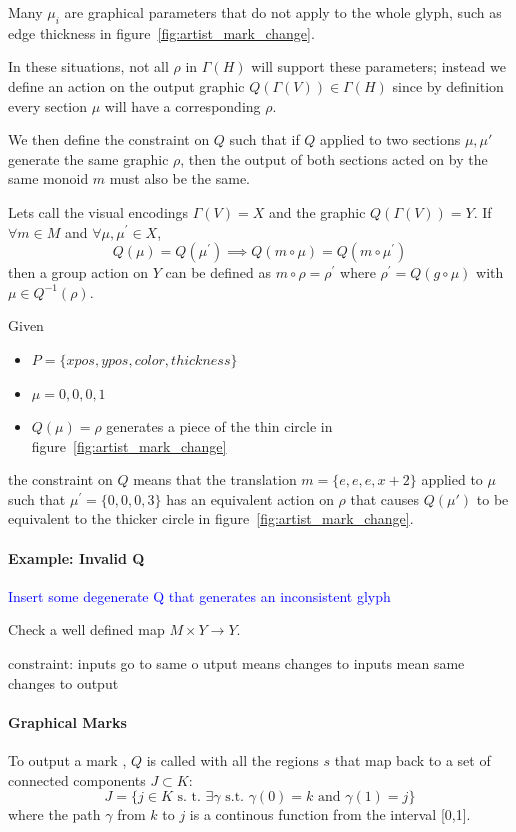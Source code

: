 \documentclass[../main.tex]{subfiles}
\begin{document}
Many $\mu_{i}$ are graphical parameters that do not apply to the whole glyph, such as edge thickness in figure~\ref{fig:artist_mark_change}. 

In these situations, not all  $\rho$ in $\Gamma(H)$ will support these parameters; instead we define an action on the output graphic $Q(\Gamma(V)) \in \Gamma(H)$ since by definition every section $\mu$ will have a corresponding $\rho$.

We then define the constraint on $Q$ such that if $Q$ applied to two sections $\mu, \mu\prime$ generate the same graphic $\rho$, then the output of both sections acted on by the same monoid $m$ must also be the same.    

Lets call the visual encodings $\Gamma(V)=X$ and the graphic $Q(\Gamma(V))=Y$. If $\forall m \in M$ and $\forall \mu, \mu^\prime \in X$, 
\begin{equation}
Q(\mu) = Q(\mu^\prime)\implies Q(m\circ\mu) = Q(m\circ\mu^\prime)
\end{equation}
then a group action on $Y$ can be defined as $m\circ \rho = \rho^\prime$ where $\rho^\prime=Q(g\circ \mu)$ with $\mu \in Q^{-1}(\rho)$. 

Given  
\begin{itemize}
    \item $P = \{xpos, ypos, color, thickness\}$
    \item $\mu = {0,0,0, 1}$
    \item  $Q(\mu)=\rho$ generates a piece of the thin circle in figure~\ref{fig:artist_mark_change}
\end{itemize}

the constraint on $Q$ means that the translation $m=\{e, e, e, x+2\}$ applied to $\mu$ such that $\mu^\prime=\{0,0,0,3\}$ has an equivalent action on $\rho$ that causes $Q(\mu\prime)$ to be equivalent to the thicker circle in figure~\ref{fig:artist_mark_change}.


\paragraph{Example: Invalid Q}
\textcolor{blue}{Insert some degenerate Q that generates an inconsistent glyph}


Check a well defined map $M\times Y \rightarrow Y$.


constraint: inputs go to same o
utput means changes to inputs mean same changes to output

\paragraph{Graphical Marks}
To output a mark  \cite{bertinIIPropertiesGraphic2011,carpendaleVisualRepresentationSemiology}, $Q$ is called with all the regions $s$ that map back to a set of connected components $J \subset K$:
\begin{equation}
J = \{j \in K \text{ s. t. } \exists \gamma \text{ s.t. } \gamma(0)=k \text{ and }\gamma(1)=j\}
\end{equation}
where the path\cite{ConnectedSpace2020}  $\gamma$ from $k$ to $j$ is a continous function from the interval [0,1].
\end{document}
